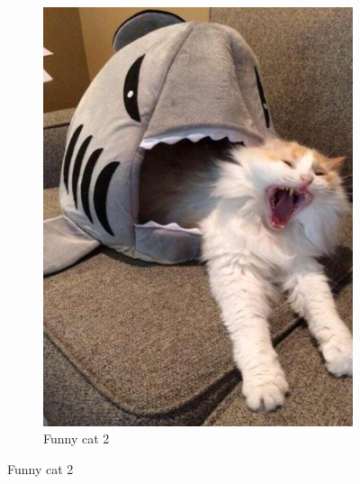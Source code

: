 \documentclass{article}
\begin{document}
\begin{figure}[h!]
\begin{subfigure}[b]{0.4\linewidth}
            \includegraphics[width=\linewidth]{cat2.jpg}
            \caption{Funny cat 2}
        \end{subfigure}
    \end{figure}

    \begin{appendix}
        \listoffigures
    \end{appendix}
\end{document}
